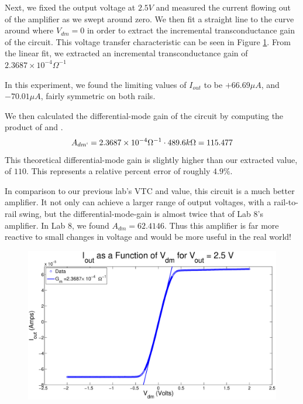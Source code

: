 Next, we fixed the output voltage at $2.5V$ and measured the current flowing
out of the amplifier as we swept \Vdm around zero. We then fit a straight line
to the curve around where $V_{dm} = 0$ in order to extract the incremental
transconductance gain of the circuit.  This voltage transfer characteristic 
can be seen in Figure \ref{fig:exp2p3}.
From the linear fit, we extracted an incremental transconductance gain of $2.3687 \times 10^{-4} \Omega^{-1}$

In this experiment, we found the limiting values of $I_{out}$ to be $+ 66.69 \mu A$, and $-70.01 \mu A$, fairly symmetric on both rails. 

We then calculated the differential-mode gain of the circuit by computing
the product of \Gm and \Ro.
$$A_{dm`} =  2.3687 \times 10^{-4} \Omega^{-1} \cdot 489.6k\Omega = 115.477$$
This theoretical differential-mode gain is slightly higher than our extracted
value, of $110$. This represents a relative percent error of roughly $4.9\%$.

In comparison to our previous lab's VTC and \Adm value, this circuit is a much better amplifier. It not only can achieve a larger range of output voltages, with a rail-to-rail swing, but the differential-mode-gain is almost twice that of Lab 8's amplifier. In Lab 8, we found $A_{dm} = 62.4146$. Thus this amplifier is far more reactive to small changes in voltage and would be more useful in the real world!


\begin{figure}[H]
\centering
\includegraphics[width=\linewidth]{../Figures/Exp2P3.eps}
\caption{}
\label{fig:exp2p3}
\end{figure}